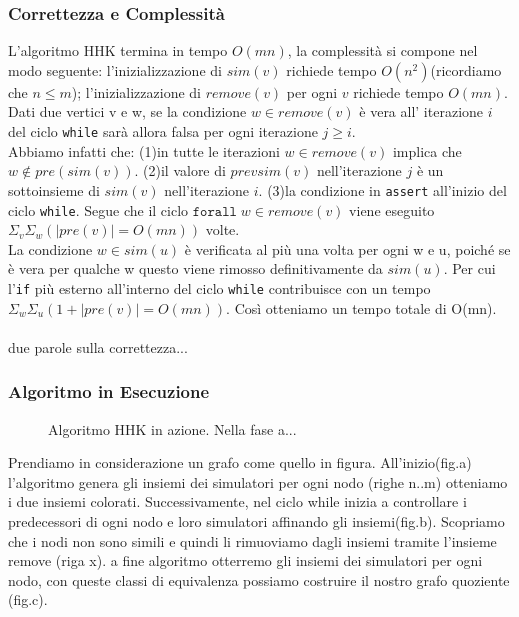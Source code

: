 \documentclass[12pt,a4paper,openright,twoside]{report}
\theoremstyle{definition}
\begin{document}
\subsubsection{Correttezza e Complessità}
L'algoritmo HHK termina in tempo $O(mn)$, la complessità si compone nel modo seguente: l'inizializzazione di $sim(v)$ richiede tempo $O(n^2)$(ricordiamo che $n \leq m$); l'inizializzazione di $remove(v)$ per ogni $v$ richiede tempo $O(mn)$.\\
Dati due vertici v e w, se la condizione $w \in remove(v)$ è vera all' iterazione $i$ del ciclo \texttt{while} sarà allora falsa per ogni iterazione $j\geq i$.\\ Abbiamo infatti che:  
(1)in tutte le iterazioni $w \in remove(v)$ implica che $w\not\in pre(sim(v))$.
(2)il valore di $prevsim(v)$ nell'iterazione $j$ è un sottoinsieme di $sim(v)$ nell'iterazione $i$.
(3)la condizione in \texttt{assert} all'inizio del ciclo \texttt{while}.
Segue che il ciclo $\mathtt{for all}\;w \in remove(v)$ viene eseguito $\Sigma_v\Sigma_w(|pre(v)|=O(mn))$ volte.\\
La condizione $w \in sim(u)$ è verificata al più una volta per ogni w e u, poiché se è vera per qualche w questo viene rimosso definitivamente da $sim(u)$. Per cui l'\texttt{if} più esterno all'interno del ciclo \texttt{while} contribuisce con un tempo $\Sigma_w\Sigma_u(1+|pre(v)|=O(mn))$. Così otteniamo un tempo totale di O(mn).\\
\paragraph{} due parole sulla correttezza...
\subsubsection{Algoritmo in Esecuzione}
\begin{figure}
\caption{Algoritmo HHK in azione. Nella fase a...}
\end{figure}
Prendiamo in considerazione un grafo come quello in figura. All'inizio(fig.a) l'algoritmo genera gli insiemi dei simulatori per ogni nodo (righe n..m) otteniamo i due insiemi colorati. Successivamente, nel ciclo while inizia a controllare i predecessori di ogni nodo e loro simulatori affinando gli insiemi(fig.b). Scopriamo che i nodi non sono simili e quindi li rimuoviamo dagli insiemi tramite l'insieme remove (riga x). a fine algoritmo otterremo gli insiemi dei simulatori per ogni nodo, con queste classi di equivalenza possiamo costruire il nostro grafo quoziente (fig.c).
\end{document}
